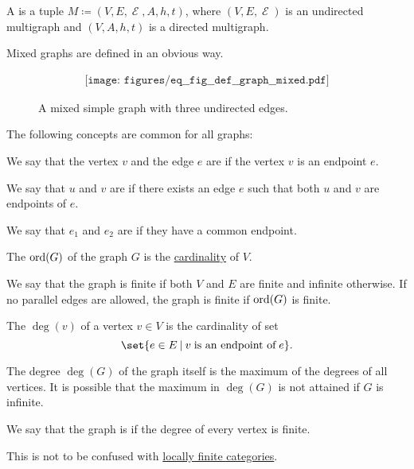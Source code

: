 \begin{definition}
\begin{thmenum}[series=def:graph]
     A  is a tuple \( M \coloneqq (V, E, \mscrE, A, h, t) \), where \( (V, E, \mscrE) \) is an undirected multigraph and \( (V, A, h, t) \) is a directed multigraph.

    Mixed graphs are defined in an obvious way.

    \begin{figure}[h]
      \begin{equation}\label{eq:fig:def:graph/mixed}
        \begin{aligned}
          \texttt{[image: figures/eq\_\_fig\_\_def\_\_graph\_\_mixed.pdf]}
        \end{aligned}
      \end{equation}
      \caption{A mixed simple graph with three undirected edges.}\label{fig:def:graph/mixed}
    \end{figure}
  \end{thmenum}

  The following concepts are common for all graphs:
  \begin{thmenum}[resume=def:graph]
     We say that the vertex \( v \) and the edge \( e \) are  if the vertex \( v \) is an endpoint \( e \).

     We say that \( u \) and \( v \) are  if there exists an edge \( e \) such that both \( u \) and \( v \) are endpoints of \( e \).

     We say that \( e_1 \) and \( e_2 \) are  if they have a common endpoint.

     The  \( \operatorname{ord}(G) \) of the graph \( G \) is the \hyperref[thm:cardinality_existence]{cardinality} of \( V \).

    We say that the graph is finite if both \( V \) and \( E \) are finite and infinite otherwise. If no parallel edges are allowed, the graph is finite if \( \operatorname{ord}(G) \) is finite.

     The  \( \deg(v) \) of a vertex \( v \in V \) is the cardinality of set
    \begin{equation*}
      \set{ e \in E \given v \T{is an endpoint of} e }.
    \end{equation*}

    The degree \( \deg(G) \) of the graph itself is the maximum of the degrees of all vertices. It is possible that the maximum in \( \deg(G) \) is not attained if \( G \) is infinite.

    We say that the graph is  if the degree of every vertex is finite.

    This is not to be confused with \hyperref[def:category_size]{locally finite categories}.
  \end{thmenum}
\end{definition}

